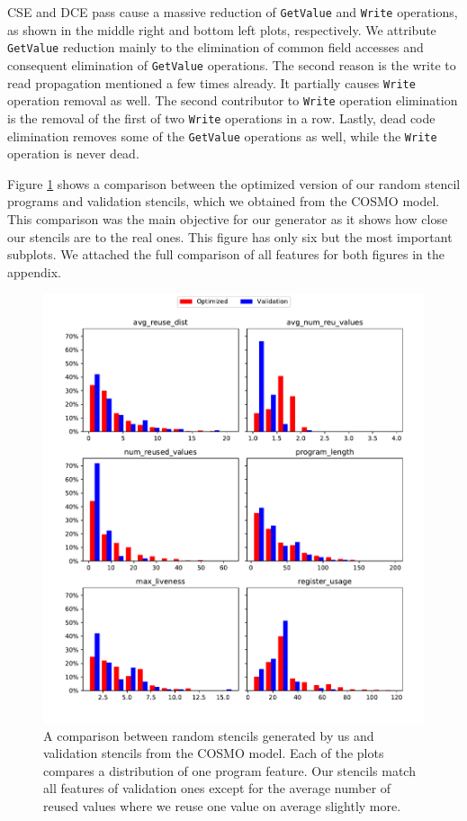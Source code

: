 \documentclass[sigplan,\review anonymous]{acmart}
\begin{document}
CSE and DCE pass cause a massive reduction of \texttt{GetValue} and
\texttt{Write} operations, as shown in the middle right and bottom left plots,
respectively. We attribute \texttt{GetValue} reduction mainly to the
elimination of common field accesses and consequent elimination of
\texttt{GetValue} operations. The second reason is the write to read
propagation mentioned a few times already. It partially causes \texttt{Write}
operation removal as well. The second contributor to \texttt{Write} operation
elimination is the removal of the first of two \texttt{Write} operations
in a row. Lastly, dead code elimination removes some of the \texttt{GetValue}
operations as well, while the \texttt{Write} operation is never dead.

Figure \ref{fig:gen_vs_val_top_features} shows a comparison between the
optimized version of our random stencil programs and validation stencils,
which we obtained from the COSMO model. This comparison was the main objective
for our generator as it shows how close our stencils are to the real ones.
This figure has only six but the most important subplots. We attached the
full comparison of all features for both figures in the appendix. 

\begin{figure}
  \centering
  \includegraphics[width=\columnwidth]{images/gen_vs_val_top_features.pdf}
  \caption{A comparison between random stencils generated by us and validation
  stencils from the COSMO model. Each of the plots compares a distribution of
  one program feature. Our stencils match all features of validation ones
  except for the average number of reused values where we reuse one value on
  average slightly more.}
  \label{fig:gen_vs_val_top_features}
\end{figure}
\end{document}
